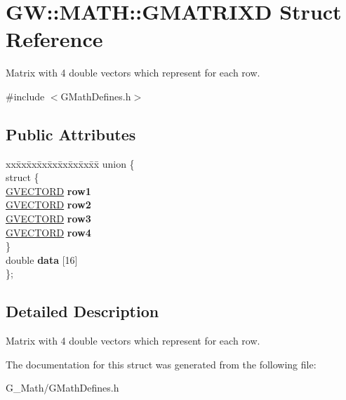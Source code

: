 \hypertarget{struct_g_w_1_1_m_a_t_h_1_1_g_m_a_t_r_i_x_d}{}\section{GW\+:\+:M\+A\+TH\+:\+:G\+M\+A\+T\+R\+I\+XD Struct Reference}
\label{struct_g_w_1_1_m_a_t_h_1_1_g_m_a_t_r_i_x_d}


Matrix with 4 double vectors which represent for each row.  




{\ttfamily \#include $<$G\+Math\+Defines.\+h$>$}

\subsection*{Public Attributes}
\begin{DoxyCompactItemize}
\item 
\mbox{\label{struct_g_w_1_1_m_a_t_h_1_1_g_m_a_t_r_i_x_d_a9b5b90e7bfb77a4cbc91737aaf08b81e}} 
\begin{tabbing}
xx\=xx\=xx\=xx\=xx\=xx\=xx\=xx\=xx\=\kill
union \{\\
\mbox{\label{union_g_w_1_1_m_a_t_h_1_1_g_m_a_t_r_i_x_d_1_1_0D16_a8199bab908e28498a331c5a7962f8b80}} 
\>struct \{\\
\>\>\mbox{\hyperlink{struct_g_w_1_1_m_a_t_h_1_1_g_v_e_c_t_o_r_d}{GVECTORD}} {\bfseries row1}\\
\>\>\mbox{\hyperlink{struct_g_w_1_1_m_a_t_h_1_1_g_v_e_c_t_o_r_d}{GVECTORD}} {\bfseries row2}\\
\>\>\mbox{\hyperlink{struct_g_w_1_1_m_a_t_h_1_1_g_v_e_c_t_o_r_d}{GVECTORD}} {\bfseries row3}\\
\>\>\mbox{\hyperlink{struct_g_w_1_1_m_a_t_h_1_1_g_v_e_c_t_o_r_d}{GVECTORD}} {\bfseries row4}\\
\>\} \\
\>double {\bfseries data} \mbox{[}16\mbox{]}\\
\}; \\

\end{tabbing}\end{DoxyCompactItemize}


\subsection{Detailed Description}
Matrix with 4 double vectors which represent for each row. 

The documentation for this struct was generated from the following file\+:\begin{DoxyCompactItemize}
\item 
G\+\_\+\+Math/G\+Math\+Defines.\+h\end{DoxyCompactItemize}
